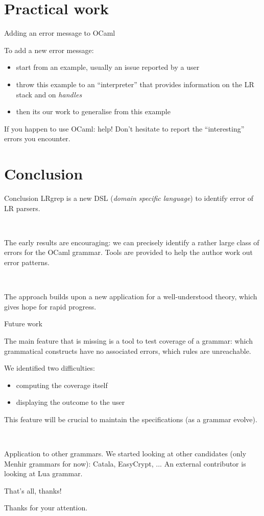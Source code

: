 \documentclass{beamer}          %
\begin{document}
\section{Practical work}

\begin{frame}{Adding an error message to OCaml}

  To add a new error message:
  \begin{itemize}
    \item start from an example, usually an issue reported by a user
    \item throw this example to an ``interpreter'' that provides information on the LR stack and on {\em handles}
    \item then its our work to generalise from this example
  \end{itemize}
  \pause
  \begin{block}{If you happen to use OCaml: help!}
    Don't hesitate to report the ``interesting'' errors you encounter.
  \end{block}
\end{frame}

\section{Conclusion}

\begin{frame}{Conclusion}
  LRgrep is a new DSL ({\em domain specific language}) to identify error of LR parsers.

\

  The early results are encouraging: we can precisely identify a rather large class of errors for the OCaml grammar. Tools are provided to help the author work out error patterns.

\

  The approach builds upon a new application for a well-understood theory, which gives hope for rapid progress.

\end{frame}

\begin{frame}{Future work}

  The main feature that is missing is a tool to test coverage of a grammar:
  which grammatical constructs have no associated errors, which rules are unreachable.

  We identified two difficulties:
\begin{itemize}
  \item computing the coverage itself
  \item displaying the outcome to the user
\end{itemize}

This feature will be crucial to maintain the specifications (as a grammar evolve).

\

\pause
Application to other grammars. We started looking at other candidates (only Menhir grammars for now): Catala, EasyCrypt, ...
An external contributor is looking at Lua grammar.

\end{frame}

\begin{frame}{That's all, thanks!}

  Thanks for your attention.

\end{frame}
\end{document}
